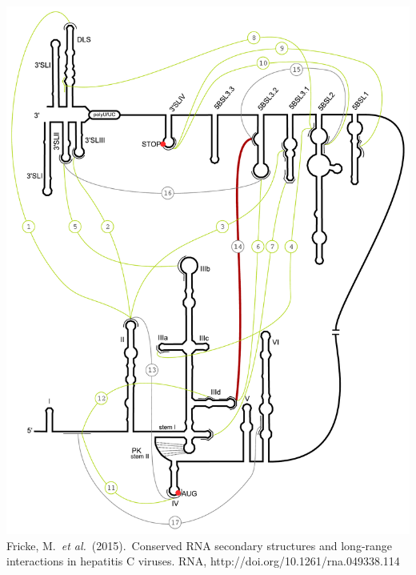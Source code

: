 \begin{frame}[c]
\begin{columns}
\begin{overlayarea}{\linewidth}{\textheight}
{  \includegraphics[height=0.7\textheight]{figures/long_range_hcv_trans.pdf}\\%
  \tiny{Fricke, M.~\textit{et al.}~(2015).~Conserved RNA secondary structures and long-range interactions in hepatitis C viruses. RNA, http://doi.org/10.1261/rna.049338.114}%
  }
   {
  \centering
}
\end{overlayarea}
\end{columns}
\end{frame}
